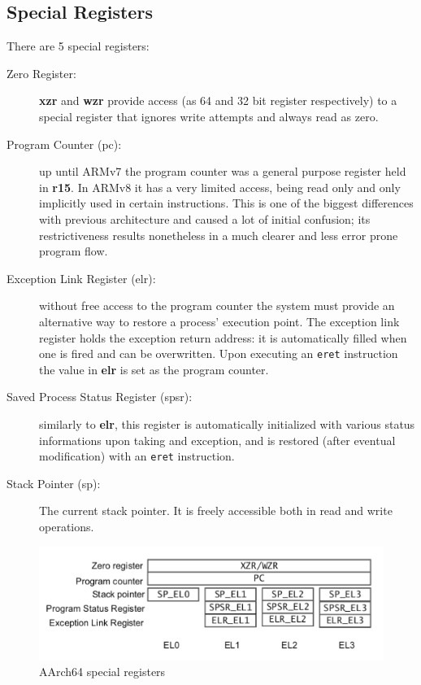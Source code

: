 \documentclass[12pt,a4paper,openright,twoside]{report}
\begin{document}
\subsection{Special Registers}
\label{spsr}
There are 5 special registers:
\begin{description}
    \item[Zero Register:] \textbf{xzr} and \textbf{wzr} provide access (as 64 and
        32 bit register respectively) to a special register that ignores write
        attempts and always read as zero.
    \item[Program Counter (pc):] up until ARMv7 the program counter was a general purpose
        register held in \textbf{r15}. In ARMv8 it has a very limited access,
        being read only and only implicitly used in certain instructions. This is 
        one of the biggest differences with previous architecture and caused a 
        lot of initial confusion; its restrictiveness results nonetheless in a
        much clearer and less error prone program flow.
    \item[Exception Link Register (elr):] without free access to the program counter
        the system must provide an alternative way to restore a process' execution
        point. The exception link register holds the exception return address: it 
        is automatically filled when one is fired and can be overwritten. Upon
        executing an {\tt eret} instruction the value in \textbf{elr} is set as the
        program counter.
    \item[Saved Process Status Register (spsr):] similarly to \textbf{elr}, this
        register is automatically initialized with various status informations
        upon taking and exception, and is restored (after eventual modification)
        with an {\tt eret} instruction.
    \item[Stack Pointer (sp):] The current stack pointer. It is freely accessible
        both in read and write operations.
\end{description}

\begin{figure}[t]
    \begin{center}
\includegraphics[scale=0.68]{tesi9.png}
\caption[special registers]{AArch64 special registers}\label{fig:specialreg}
    \end{center}
\end{figure}
\end{document}
